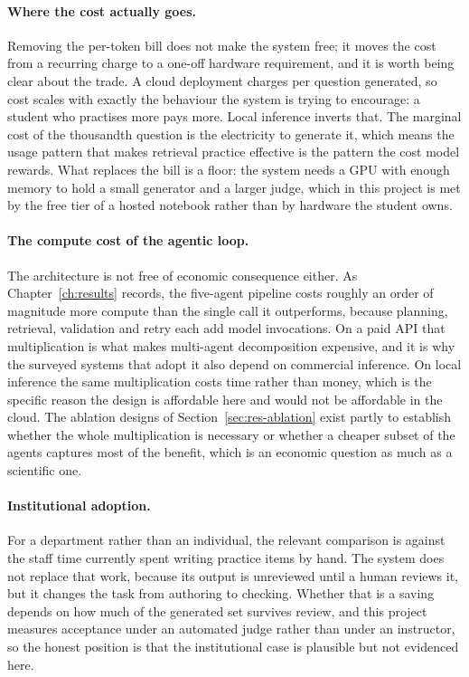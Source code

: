 \paragraph{Where the cost actually goes.} Removing the per-token bill does
not make the system free; it moves the cost from a recurring charge to a
one-off hardware requirement, and it is worth being clear about the trade.
A cloud deployment charges per question generated, so cost scales with
exactly the behaviour the system is trying to encourage: a student who
practises more pays more. Local inference inverts that. The marginal cost of
the thousandth question is the electricity to generate it, which means the
usage pattern that makes retrieval practice effective is the pattern the cost
model rewards. What replaces the bill is a floor: the system needs a GPU with
enough memory to hold a small generator and a larger judge, which in this
project is met by the free tier of a hosted notebook rather than by hardware
the student owns.

\paragraph{The compute cost of the agentic loop.} The architecture is not free
of economic consequence either. As Chapter~\ref{ch:results} records, the
five-agent pipeline costs roughly an order of magnitude more compute than the
single call it outperforms, because planning, retrieval, validation and retry
each add model invocations. On a paid API that multiplication is what makes
multi-agent decomposition expensive, and it is why the surveyed systems that
adopt it also depend on commercial inference. On local inference the same
multiplication costs time rather than money, which is the specific reason the
design is affordable here and would not be affordable in the cloud. The
ablation designs of Section~\ref{sec:res-ablation} exist partly to establish
whether the whole multiplication is necessary or whether a cheaper subset of
the agents captures most of the benefit, which is an economic question as much
as a scientific one.

\paragraph{Institutional adoption.} For a department rather than an individual,
the relevant comparison is against the staff time currently spent writing
practice items by hand. The system does not replace that work, because its
output is unreviewed until a human reviews it, but it changes the task from
authoring to checking. Whether that is a saving depends on how much of the
generated set survives review, and this project measures acceptance under an
automated judge rather than under an instructor, so the honest position is
that the institutional case is plausible but not evidenced here.

